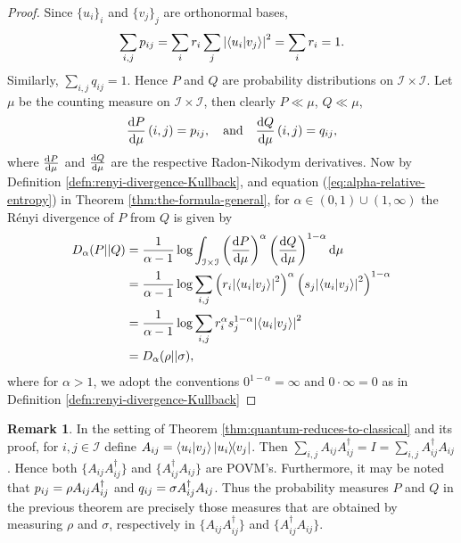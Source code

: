 \documentclass[12pt,a4paper,oneside]{article}
\numberwithin{equation}{section}
\theoremstyle{definition}  %
\newtheorem{rmk}[defn]{Remark}
\theoremstyle{plain}  %
\theoremstyle{remark} %
\let\tr\relax
\DeclareMathOperator{\tr}{Tr}
\begin{document}
\begin{proof}
Since $\{u_i\}_{i}$ and $\{v_j\}_{j}$ are orthonormal bases, \[\sum_{i,j}p_{ij} = \sum_{i}r_i\sum_j\abs{\braket{u_i}{v_j}}^2 = \sum_{i}r_i = 1.\]
Similarly, $\sum_{i,j}q_{ij} = 1$. Hence $P$ and $Q$ are probability distributions on $\mathcal{I}\times \mathcal{I}$. Let $\mu$ be the counting measure on $\mathcal{I}\times \mathcal{I}$, then clearly $P\ll\mu$, $Q\ll\mu$, \begin{align*}
    \dv{P}{\mu}\,(i,j)=p_{ij}, \quad \textnormal{and} \quad \dv{Q}{\mu}\,(i,j)=q_{ij},
\end{align*} where $\dv{P}{\mu}$ and $\dv{Q}{\mu}$ are the respective Radon-Nikodym derivatives. Now by Definition \ref{defn:renyi-divergence-Kullback},  and equation (\ref{eq:alpha-relative-entropy}) in Theorem \ref{thm:the-formula-general},  for $\alpha\in (0,1)\cup (1,\infty)$ the R\'enyi divergence of $P$ from $Q$ is given by 
\begin{align*}
 D_{\alpha}(P||Q) &= \frac{1}{\alpha-1} \log \int_{\mathcal{I}\times \mathcal{I}} \left(\dv{P}{\mu}\right)^\alpha \left(\dv{Q}{\mu}\right)^{1-\alpha} \dd \mu   \\
&= \frac{1}{\alpha-1} \log \sum\limits_{i,j} \left(r_i\abs{\braket{u_i}{v_j}}^2\right)^\alpha\left(s_j\abs{\braket{u_i}{v_j}}^2\right)^{1-\alpha}\\
&=\frac{1}{\alpha-1} \log \sum\limits_{i,j} r_i^\alpha s_j^{1-\alpha}\abs{\braket{u_i}{v_j}}^2\\
&= D_{\alpha}(\rho||\sigma),
\end{align*}
where for $\alpha>1$, we adopt the conventions $0^{1-\alpha} = \infty$ and $0\cdot \infty = 0$ as in Definition \ref{defn:renyi-divergence-Kullback}
\end{proof}
\begin{rmk}\label{rmk:quamtum-classical-measurement}
In the setting of Theorem \ref{thm:quantum-reduces-to-classical} and its proof, for $i,j\in \mathcal{I}$ define $A_{ij} = \braket{u_i}{v_j}\ketbra{u_i}{v_j}$. Then $\sum_{i,j}A_{ij}A_{ij}^\dagger = I = \sum_{i,j}A_{ij}^\dagger A_{ij}$. Hence both $\{A_{ij}A_{ij}^\dagger\}$ and $\{A_{ij}^\dagger A_{ij}\}$ are POVM's. Furthermore, it may be noted that $p_{ij} = \tr \rho A_{ij}A_{ij}^\dagger$ and $q_{ij} =  \tr \sigma A_{ij}^\dagger A_{ij}$. Thus the probability measures $P$ and $Q$ in the previous theorem are precisely those measures that are obtained by measuring $\rho$ and $\sigma$, respectively in $\{A_{ij}A_{ij}^\dagger\}$ and  $\{A_{ij}^\dagger A_{ij}\}$.
\end{rmk}
\end{document}
